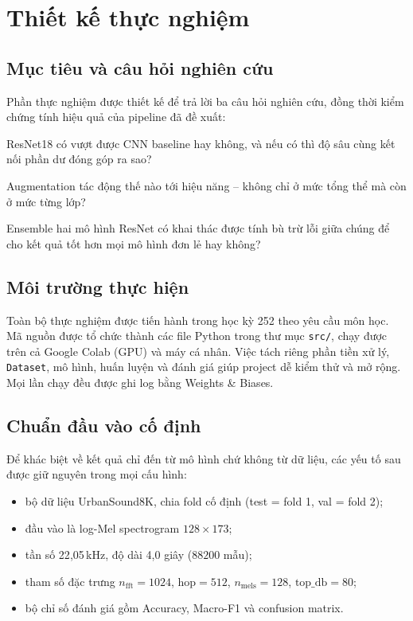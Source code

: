 \section{Thiết kế thực nghiệm}
\label{sec:expdesign}

\subsection{Mục tiêu và câu hỏi nghiên cứu}

Phần thực nghiệm được thiết kế để trả lời ba câu hỏi nghiên cứu, đồng thời kiểm
chứng tính hiệu quả của pipeline đã đề xuất:

\begin{description}[leftmargin=2.4em,itemsep=3pt]
  \item[\textbf{CH1.}] ResNet18 có vượt được CNN baseline hay không, và nếu có
        thì độ sâu cùng kết nối phần dư đóng góp ra sao?
  \item[\textbf{CH2.}] Augmentation tác động thế nào tới hiệu năng -- không chỉ ở
        mức tổng thể mà còn ở mức từng lớp?
  \item[\textbf{CH3.}] Ensemble hai mô hình ResNet có khai thác được tính bù trừ
        lỗi giữa chúng để cho kết quả tốt hơn mọi mô hình đơn lẻ hay không?
\end{description}

\subsection{Môi trường thực hiện}

Toàn bộ thực nghiệm được tiến hành trong học kỳ 252 theo yêu cầu môn học. Mã
nguồn được tổ chức thành các file Python trong thư mục \texttt{src/}, chạy được
trên cả Google Colab (GPU) và máy cá nhân. Việc tách riêng phần tiền xử lý,
\texttt{Dataset}, mô hình, huấn luyện và đánh giá giúp project dễ kiểm thử và mở
rộng. Mọi lần chạy đều được ghi log bằng Weights \& Biases.

\subsection{Chuẩn đầu vào cố định}

Để khác biệt về kết quả chỉ đến từ mô hình chứ không từ dữ liệu, các yếu tố sau
được giữ nguyên trong mọi cấu hình:

\begin{itemize}[leftmargin=1.4em,itemsep=1pt]
  \item bộ dữ liệu UrbanSound8K, chia fold cố định (test = fold 1, val = fold 2);
  \item đầu vào là log-Mel spectrogram $128 \times 173$;
  \item tần số 22{,}05\,kHz, độ dài 4{,}0 giây ($88200$ mẫu);
  \item tham số đặc trưng $n_{\text{fft}}=1024$, $\text{hop}=512$,
        $n_{\text{mels}}=128$, $\text{top\_db}=80$;
  \item bộ chỉ số đánh giá gồm Accuracy, Macro-F1 và confusion matrix.
\end{itemize}

